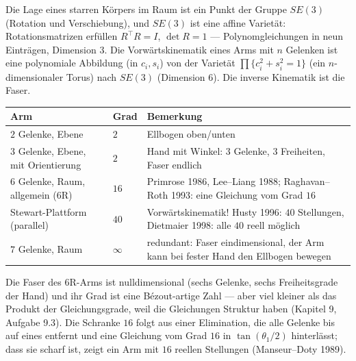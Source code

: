 \begin{merksatz}
Die Lage eines starren Körpers im Raum ist ein Punkt der Gruppe $SE(3)$ (Rotation und Verschiebung), und $SE(3)$ ist eine affine Varietät: Rotationsmatrizen erfüllen $R^{\top}R = I$, $\det R = 1$ --- Polynomgleichungen in neun Einträgen, Dimension $3$. Die Vorwärtskinematik eines Arms mit $n$ Gelenken ist eine polynomiale Abbildung (in $c_i, s_i$) von der Varietät $\prod\{c_i^{2} + s_i^{2} = 1\}$ (ein $n$-dimensionaler Torus) nach $SE(3)$ (Dimension $6$). Die inverse Kinematik ist die Faser.

\begin{center}
{\small
\renewcommand{\arraystretch}{1.5}
\begin{tabular}{@{}P{3.6cm}P{1.2cm}P{3.8cm}@{}}
\toprule
\textbf{Arm} & \textbf{Grad} & \textbf{Bemerkung}\\
\midrule
$2$ Gelenke, Ebene & $2$ & Ellbogen oben/unten\\
$3$ Gelenke, Ebene, mit Orientierung & $2$ & Hand mit Winkel: $3$ Gelenke, $3$ Freiheiten, Faser endlich\\
$6$ Gelenke, Raum, allgemein (6R) & $16$ & Primrose 1986, Lee--Liang 1988; Raghavan--Roth 1993: eine Gleichung vom Grad $16$\\
Stewart-Plattform (parallel) & $40$ & Vorwärtskinematik! Husty 1996: $40$ Stellungen, Dietmaier 1998: alle $40$ reell möglich\\
$7$ Gelenke, Raum & $\infty$ & redundant: Faser eindimensional, der Arm kann bei fester Hand den Ellbogen bewegen\\
\bottomrule
\end{tabular}}
\end{center}

Die Faser des 6R-Arms ist nulldimensional (sechs Gelenke, sechs Freiheitsgrade der Hand) und ihr Grad ist eine Bézout-artige Zahl --- aber viel kleiner als das Produkt der Gleichungsgrade, weil die Gleichungen Struktur haben (Kapitel 9, Aufgabe 9.3). Die Schranke $16$ folgt aus einer Elimination, die alle Gelenke bis auf eines entfernt und eine Gleichung vom Grad $16$ in $\tan(\theta_1/2)$ hinterlässt; dass sie scharf ist, zeigt ein Arm mit $16$ reellen Stellungen (Manseur--Doty 1989).


\end{merksatz}
